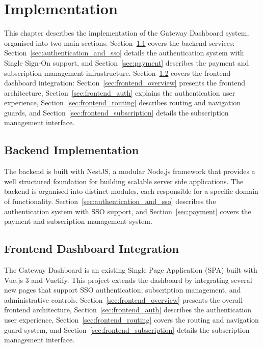 \chapter{Implementation}
\label{chap:implementation}

This chapter describes the implementation of the Gateway Dashboard system, organised into two main sections. Section~\ref{sec:backend} covers the backend services: Section~\ref{sec:authentication_and_sso} details the authentication system with Single Sign-On support, and Section~\ref{sec:payment} describes the payment and subscription management infrastructure. Section~\ref{sec:frontend} covers the frontend dashboard integration: Section~\ref{sec:frontend_overview} presents the frontend architecture, Section~\ref{sec:frontend_auth} explains the authentication user experience, Section~\ref{sec:frontend_routing} describes routing and navigation guards, and Section~\ref{sec:frontend_subscription} details the subscription management interface.

\section{Backend Implementation}
\label{sec:backend}

The backend is built with NestJS, a modular Node.js framework that provides a well structured foundation for building scalable server side applications. The backend is organised into distinct modules, each responsible for a specific domain of functionality. Section~\ref{sec:authentication_and_sso} describes the authentication system with SSO support, and Section~\ref{sec:payment} covers the payment and subscription management system.




\section{Frontend Dashboard Integration}
\label{sec:frontend}

The Gateway Dashboard is an existing Single Page Application (SPA) built with Vue.js 3 and Vuetify. This project extends the dashboard by integrating several new pages that support SSO authentication, subscription management, and administrative controls. Section~\ref{sec:frontend_overview} presents the overall frontend architecture, Section~\ref{sec:frontend_auth} describes the authentication user experience, Section~\ref{sec:frontend_routing} covers the routing and navigation guard system, and Section~\ref{sec:frontend_subscription} details the subscription management interface.

